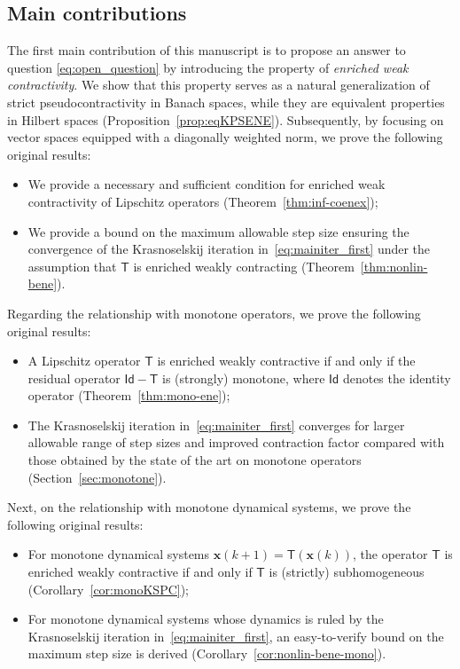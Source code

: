\documentclass[journal,twoside,web]{ieeecolor}
\newcommand{\xb}{\boldsymbol{x}}
\newcommand{\Ts}{\mathsf{T}}
\newcommand{\Is}{\mathsf{Id}}
\begin{document}
\subsection{Main contributions}

The first main contribution of this manuscript is to propose an answer to question \eqref{eq:open_question} by introducing the property of \textit{enriched weak contractivity}. We show that this property serves as a natural generalization of strict pseudocontractivity in Banach spaces, while they are equivalent properties in Hilbert spaces (Proposition~\ref{prop:eqKPSENE}).
%
Subsequently, by focusing on vector spaces equipped with a diagonally weighted norm, we prove the following original results:
%
\begin{itemize}
    \item We provide a necessary and sufficient condition for enriched weak contractivity of Lipschitz operators (Theorem~\ref{thm:inf-coenex});
    \item We provide a bound on the maximum allowable step size ensuring the convergence of the Krasnoselskij iteration in~\eqref{eq:mainiter_first} under the assumption that $\Ts$ is enriched weakly contracting (Theorem~\ref{thm:nonlin-bene}).
\end{itemize}
%
Regarding the relationship with monotone operators, we prove the following original results:
%
\begin{itemize}
    \item A Lipschitz operator $\Ts$ is enriched weakly contractive if and only if the residual operator $\Is-\Ts$ is (strongly) monotone, where $\Is$ denotes the identity operator (Theorem~\ref{thm:mono-ene});
    \item The Krasnoselskij iteration in~\eqref{eq:mainiter_first} converges for larger allowable range of step sizes and improved contraction factor compared with those obtained by the state of the art on monotone operators~\cite{davydov2024non} (Section~\ref{sec:monotone}).
\end{itemize}
%
Next, on the relationship with monotone dynamical systems, we prove the following original results:
%
\begin{itemize}
    \item For monotone dynamical systems $\xb(k+1)=\Ts(\xb(k))$, the operator $\Ts$ is enriched weakly contractive if and only if $\Ts$ is (strictly) subhomogeneous (Corollary~\ref{cor:monoKSPC});
    \item For monotone dynamical systems whose dynamics is ruled by the Krasnoselskij iteration in~\eqref{eq:mainiter_first}, an easy-to-verify bound on the maximum step size is derived (Corollary~\ref{cor:nonlin-bene-mono}).
\end{itemize}
\end{document}
